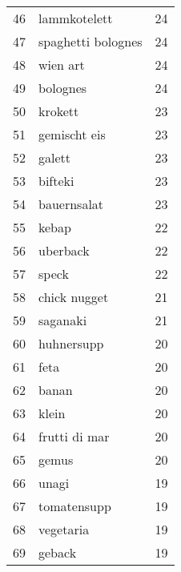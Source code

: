 \begin{tabular}{llr}
46   &                                       lammkotelett &     24 \\
47   &                                 spaghetti bolognes &     24 \\
48   &                                           wien art &     24 \\
49   &                                           bolognes &     24 \\
50   &                                            krokett &     23 \\
51   &                                       gemischt eis &     23 \\
52   &                                             galett &     23 \\
53   &                                            bifteki &     23 \\
54   &                                        bauernsalat &     23 \\
55   &                                              kebap &     22 \\
56   &                                           uberback &     22 \\
57   &                                              speck &     22 \\
58   &                                       chick nugget &     21 \\
59   &                                           saganaki &     21 \\
60   &                                         huhnersupp &     20 \\
61   &                                               feta &     20 \\
62   &                                              banan &     20 \\
63   &                                              klein &     20 \\
64   &                                      frutti di mar &     20 \\
65   &                                              gemus &     20 \\
66   &                                              unagi &     19 \\
67   &                                        tomatensupp &     19 \\
68   &                                          vegetaria &     19 \\
69   &                                             geback &     19 \\

\end{tabular}
